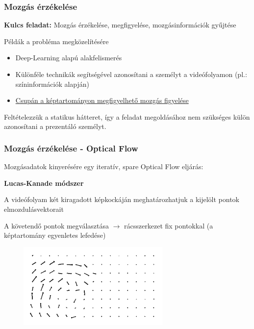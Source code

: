 \documentclass{beamer}
\begin{document}
\begin{frame}[fragile]
\frametitle{Mozgás érzékelése}

\textbf{Kulcs feladat:} Mozgás érzékelése, megfigyelése, mozgásinformációk gyűjtése

\medskip

\begin{block}{Példák a probléma megközelítésére}
\begin{itemize}
	\item Deep-Learning alapú alakfelismerés
	\item Különféle technikák segítségével azonosítani a személyt a videófolyamon (pl.: színinformációk alapján)
	\item \underline{Csupán a képtartományon megfigyelhető mozgás figyelése}
\end{itemize}
\end{block}

\bigskip

Feltételezzük a statikus hátteret, így a feladat megoldásához nem szükséges külön azonosítani a prezentáló személyt.

\end{frame}

\begin{frame}[fragile]
\frametitle{Mozgás érzékelése - Optical Flow}

Mozgásadatok kinyerésére egy iteratív, spare Optical Flow eljárás:

\textbf{Lucas-Kanade módszer}

A videófolyam két kiragadott képkockáján meghatározhatjuk a kijelölt pontok elmozdulásvektorait

\medskip

A követendő pontok megválasztása $\rightarrow$ rácsszerkezet fix pontokkal (a képtartomány egyenletes lefedése)

\begin{figure}[htb]
	\includegraphics[width=7.5cm]{images/vectorField.png}
\end{figure}

\end{frame}
\end{document}
